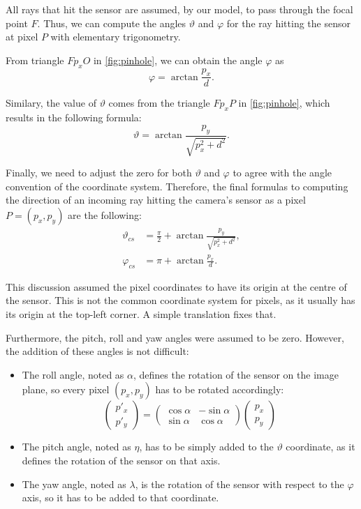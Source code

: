 All rays that hit the sensor are assumed, by our model, to pass through the focal point $F$. Thus, we can compute the angles $\vartheta$ and $\varphi$ for the ray hitting the sensor at pixel $P$ with elementary trigonometry.

From triangle $Fp_xO$ in \autoref{fig:pinhole}, we can obtain the angle $\varphi$ as
\[
	\varphi = \arctan{\frac{p_x}{d}}.
\]

Similary, the value of $\vartheta$ comes from the triangle $Fp_xP$ in \autoref{fig:pinhole}, which results in the following formula:
\[
	\vartheta = \arctan{\frac{p_y}{\sqrt{p_x^2 + d^2}}}.
\]

Finally, we need to adjust the zero for both $\vartheta$ and $\varphi$ to agree with the angle convention of the coordinate system. Therefore, the final formulas to computing the direction of an incoming ray hitting the camera's sensor as a pixel $P = (p_x, p_y)$ are the following:
\begin{align}
	\vartheta_{cs} &= \frac{\pi}{2} + \arctan{\frac{p_y}{\sqrt{p_x^2 + d^2}}}, \\
	\varphi_{cs} &= \pi + \arctan{\frac{p_x}{d}}.
\end{align}

This discussion assumed the pixel coordinates to have its origin at the centre of the sensor. This is not the common coordinate system for pixels, as it usually has its origin at the top-left corner. A simple translation fixes that.

Furthermore, the pitch, roll and yaw angles were assumed to be zero. However, the addition of these angles is not difficult:
\begin{itemize}
	\item The roll angle, noted as $\alpha$, defines the rotation of the sensor on the image plane, so every pixel $(p_x, p_y)$ has to be rotated accordingly:
	\[
		\begin{pmatrix}
			p'_x \\
			p'_y
		\end{pmatrix} = 
		\begin{pmatrix}
			\cos\alpha & -\sin\alpha \\
			\sin\alpha & \cos\alpha 
		\end{pmatrix}
		\begin{pmatrix}
			p_x \\
			p_y
		\end{pmatrix}
	\]
	\item The pitch angle, noted as $\eta$, has to be simply added to the $\vartheta$ coordinate, as it defines the rotation of the sensor on that axis.
	\item The yaw angle, noted as $\lambda$, is the rotation of the sensor with respect to the $\varphi$ axis, so it has to be added to that coordinate.	
\end{itemize}

